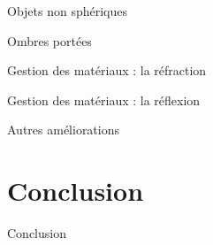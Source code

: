 \documentclass{beamer}
\begin{document}
\begin{frame}{Objets non sphériques}
\end{frame}

\begin{frame}{Ombres portées}
\end{frame}

\begin{frame}{Gestion des matériaux : la réfraction}
\end{frame}

\begin{frame}{Gestion des matériaux : la réflexion}
\end{frame}

\begin{frame}{Autres améliorations}
\end{frame}

\section{Conclusion}
\begin{frame}{Conclusion}
\end{frame}
\end{document}
